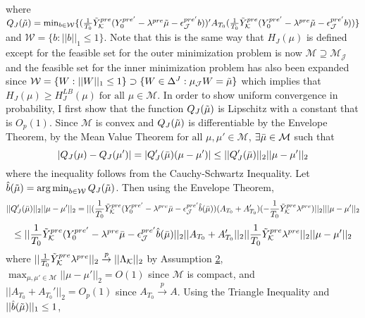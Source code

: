 \documentclass{article}
\DeclareMathOperator*{\argmin}{arg\,min}
\begin{document}
where $Q_J(\Tilde{\mu}) = \min_{b \in \mathcal{W}} \{  (\frac{1}{T_0} \Tilde{Y}_{\mathcal{K}}^{pre}(Y_{0}^{pre'} -\lambda^{pre}\Tilde{\mu} - \epsilon_{\mathcal{J}}^{pre'}b))'A_{T_0}(\frac{1}{T_0} \Tilde{Y}_{\mathcal{K}}^{pre}(Y_{0}^{pre'} - \lambda^{pre}\Tilde{\mu} - \epsilon_{\mathcal{J}}^{pre'}b)) \}$ and $\mathcal{W} = \{b : ||b||_1 \leq 1\}$. Note that this is the same way that $H_J(\mu)$ is defined except for the feasible set for the outer minimization problem is now $\mathcal{M} \supseteq \mathcal{M}_{\mathcal{J}}$ and the feasible set for the inner minimization problem has also been expanded since $\mathcal{W} =  \{W : ||W||_1 \leq 1\} \supset \{W\in \Delta^J: \mu_{\mathcal{J}} W = \Tilde{\mu}\}$ which implies that $H_J(\mu) \geq H^{LB}_J(\mu) \; \text{for all } \mu \in \mathcal{M}$. In order to show uniform convergence in probability, I first show that the function $Q_J(\Tilde{\mu})$ is Lipschitz with a constant that is $O_p(1)$. Since $\mathcal{M}$ is convex and $Q_J(\Tilde{\mu})$ is differentiable by the Envelope Theorem, by the Mean Value Theorem $\text{for all } \mu, \mu' \in \mathcal{M}$, $\exists \Bar{\mu} \in \mathcal{M}$ such that 
\begin{equation*}
    |Q_J(\mu) - Q_J(\mu')| = |Q_J'(\Bar{\mu})(\mu - \mu')| \leq ||Q_J'(\Bar{\mu})||_2 ||\mu - \mu'||_2
\end{equation*}
where the inequality follows from the Cauchy-Schwartz Inequality. Let $\hat{b}(\Tilde{\mu}) = \argmin_{b \in \mathcal{W}}  Q_J(\Tilde{\mu})$. Then using the Envelope Theorem, 
\begin{equation*}
    ||Q_J'(\Bar{\mu})||_2  ||\mu - \mu'||_2 = ||(\frac{1}{T_0}\Tilde{Y}_{\mathcal{K}}^{pre}(Y_{0}^{pre'} -\lambda^{pre}\Bar{\mu} - \epsilon_{\mathcal{J}}^{pre'}\hat{b}(\Bar{\mu}))(A_{T_0} + A_{T_0}')(-\frac{1}{T_0}\Tilde{Y}_{\mathcal{K}}^{pre}\lambda^{pre}) ||_2 | ||\mu - \mu'||_2   
\end{equation*}
\begin{equation*}
    \leq ||\frac{1}{T_0}\Tilde{Y}_{\mathcal{K}}^{pre}(Y_{0}^{pre'} -\lambda^{pre}\Bar{\mu} - \epsilon_{\mathcal{J}}^{pre'}\hat{b}(\Bar{\mu})||_2 ||A_{T_0} + A_{T_0}'||_2 ||\frac{1}{T_0}\Tilde{Y}_{\mathcal{K}}^{pre}\lambda^{pre}||_2 ||\mu - \mu'||_2
\end{equation*}
where $||\frac{1}{T_0}\Tilde{Y}_{\mathcal{K}}^{pre}\lambda^{pre}||_2 \overset{p}{\rightarrow} ||\Lambda_{\mathcal{K}}||_2$ by Assumption \hyperref[A2]{2}, $\max_{\mu,\mu' \in \mathcal{M}} ||\mu-\mu'||_2 = O(1)$ since $\mathcal{M}$ is compact, and $||A_{T_0} + A_{T_0}'||_2 = O_p(1)$ since $A_{T_0} \overset{p}{\rightarrow} A$. Using the Triangle Inequality and $||\hat{b}(\Tilde{\mu})||_1 \leq 1$,
\end{document}
